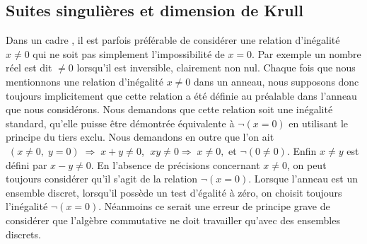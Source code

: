 \subsection{Suites singulières et dimension de Krull} 
\label{subsecPsr}

\vspace{1em}
\label{nbpIneq}Dans un cadre \cof, il est parfois préférable de 
considérer une relation d'inégalité $x\neq 0$ qui ne soit pas 
simplement l'impossibilité de $x=0$. Par exemple un nombre réel est 
dit $\neq 0$ lorsqu'il est inversible, \cad clairement non nul. Chaque 
fois que nous mentionnons une relation d'inégalité $x\neq 0$ dans un 
anneau, nous supposons donc toujours implicitement que cette relation a 
été définie au préalable dans l'anneau que nous considérons. 
Nous demandons que cette relation soit une inégalité standard, \cad 
qu'elle puisse être démontrée équivalente à $\lnot(x=0)$ en 
utilisant le principe du tiers exclu. Nous demandons en outre que l'on ait 
\cot  
$\; (x\neq 0,\; y=0)\; \Rightarrow\;  x+y\neq 0$,  
$\; xy\neq 0\Rightarrow \; x\neq 0,$ et
$\lnot(0\neq 0)$. Enfin  $x\neq y$ est défini par  $x-y\neq 0$.
En l'absence de précisions concernant  $x\neq 0$, on peut toujours 
considérer qu'il s'agit de la relation $\lnot(x=0)$. Lorsque l'anneau 
est un ensemble discret, \cad lorsqu'il possède un test d'égalité 
à zéro, on choisit toujours l'inégalité $\lnot(x=0)$. Néanmoins 
ce serait une erreur de principe grave de considérer que l'algèbre 
commutative ne doit travailler qu'avec des ensembles discrets.
